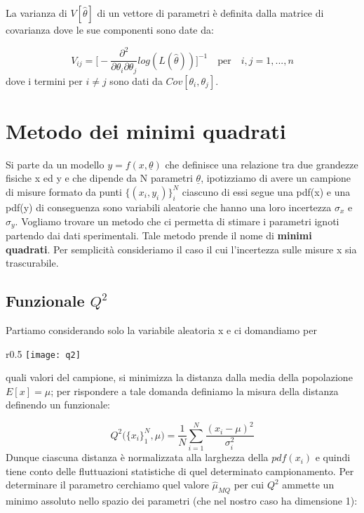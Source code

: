 La varianza di $V[\hat{\theta}]$ di un vettore di parametri \`{e} definita dalla matrice di covarianza dove le sue componenti sono date da:

\begin{equation}
	V_{ij} = \Big[ - \dfrac{\partial^2}{\partial \theta_i \partial \theta_j}log(L(\hat{\theta})) \Big]^{-1} \quad \text{per} \quad i,j = 1,...,n
\end{equation}
dove i termini per $i \neq j$ sono dati da $Cov[\theta_i,\theta_j]$.


\section{Metodo dei minimi quadrati}
Si parte da un modello $y = f(x,\underline{\theta})$ che definisce una relazione tra due grandezze fisiche x ed y e che dipende da N parametri $\underline{\theta}$, ipotizziamo di avere un campione di misure formato da punti $\{(x_i,y_i)\}_{i}^N$ ciascuno di essi segue una pdf(x) e una pdf(y) di conseguenza sono variabili aleatorie che hanno una loro incertezza $\sigma_x$ e $\sigma_y$. Vogliamo trovare un metodo che ci permetta di stimare i parametri ignoti partendo dai dati sperimentali. Tale metodo prende il nome di \textbf{minimi quadrati}. Per semplicit\`{a} consideriamo il caso il cui l'incertezza sulle misure x sia trascurabile.

\subsection{Funzionale $Q^2$}

\noindent Partiamo considerando solo la variabile aleatoria x  e ci domandiamo per 
\begin{wrapfigure}{r}{0.5 \textwidth}
\vspace{-10pt}
\centering
\texttt{[image: q2]}	
\end{wrapfigure}
quali valori del campione, si minimizza la distanza dalla media della popolazione $E[x] = \mu$; per rispondere a tale domanda definiamo la misura della distanza definendo un funzionale:
\newline

\begin{equation}
	Q^2\Big(\{x_i\}_1^N,\mu \Big) = \dfrac{1}{N}\sum_{i=1}^N\dfrac{(x_i - \mu)^2}{\sigma_i^2}
\end{equation}
\newline
Dunque ciascuna distanza \`{e} normalizzata alla larghezza della $pdf(x_i)$ e quindi tiene conto delle fluttuazioni statistiche di quel determinato campionamento.\newline
 Per determinare il  parametro cerchiamo quel valore $\hat{\mu}_{MQ}$ per cui $Q^2$ ammette un minimo assoluto nello spazio dei parametri (che nel nostro caso ha dimensione 1):

